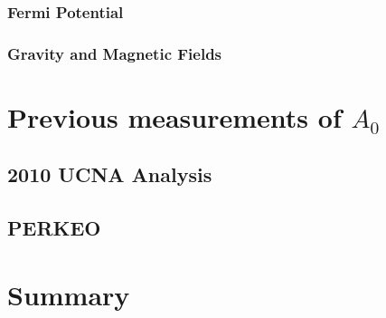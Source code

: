\subsubsection{Fermi Potential}

\subsubsection{Gravity and Magnetic Fields}

\section{Previous measurements of $A_{0}$}
\label{sec:Previous_results}

\subsection{2010 UCNA Analysis}
\subsection{PERKEO}

\section{Summary}



